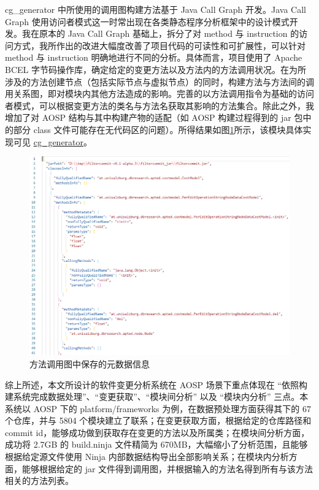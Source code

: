 cg\_generator 中所使用的调用图构建方法基于 Java Call Graph 开发。Java Call Graph 使用访问者模式这一时常出现在各类静态程序分析框架中的设计模式开发。我在原本的 Java Call Graph 基础上，拆分了对 method 与 instruction 的访问方式，我所作出的改进大幅度改善了项目代码的可读性和可扩展性，可以针对 method 与 instruction 明确地进行不同的分析。具体而言，项目使用了 Apache BCEL 字节码操作库，确定给定的变更方法以及方法内的方法调用状况。在为所涉及的方法创建节点（包括实际节点与虚拟节点）的同时，构建方法与方法间的调用关系图，即对模块内其他方法造成的影响。完善的以方法调用指令为基础的访问者模式，可以根据变更方法的类名与方法名获取其影响的方法集合。除此之外，我增加了对 AOSP 结构与其中构建产物的适配（如 AOSP 构建过程得到的 jar 包中的部分 class 文件可能存在无代码区的问题）。所得结果如图\ref{fig:design-cg-generator}所示，该模块具体实现可见 \href{https://github.com/AOSPworking/cg_generator}{cg\_generator}。

\begin{figure}
    \centering
    \includegraphics[width=.6\textwidth]{figures/design-cg-generator.png}
    \caption{方法调用图中保存的元数据信息}
    \label{fig:design-cg-generator}
\end{figure}

综上所述，本文所设计的软件变更分析系统在 AOSP 场景下重点体现在 “依照构建系统完成数据处理”、“变更获取”、“模块间分析” 以及 “模块内分析” 三点。本系统以 AOSP 下的 platform/frameworks 为例，在数据预处理方面获得其下的 67 个仓库，并与 5804 个模块建立了联系；在变更获取方面，根据给定的仓库路径和 commit id，能够成功做到获取存在变更的方法以及所属类；在模块间分析方面，成功将 2.7GB 的 build.ninja 文件精简为 670MB，大幅缩小了分析范围，且能够根据给定源文件使用 Ninja 内部数据结构导出全部影响关系；在模块内分析方面，能够根据给定的 jar 文件得到调用图，并根据输入的方法名得到所有与该方法相关的方法列表。